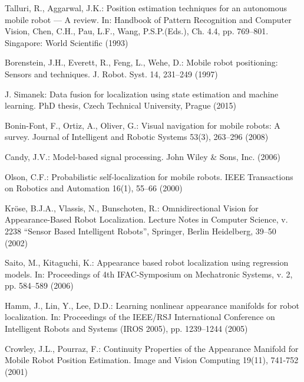 \documentclass[conference]{IEEEtran} %
\begin{document}
\begin{thebibliography}{100}

Talluri, R., Aggarwal, J.K.: Position estimation techniques for an autonomous mobile robot --- A review. In: Handbook of Pattern Recognition and Computer Vision, Chen, C.H., Pau, L.F., Wang, P.S.P.(Eds.), Ch. 4.4, pp. 769--801. Singapore: World Scientific (1993)

Borenstein, J.H., Everett, R., Feng, L., Wehe, D.: Mobile robot positioning: Sensors and techniques. J. Robot. Syst. 14, 231--249 (1997)

J. Simanek: Data fusion for localization using state estimation and machine learning. PhD thesis, Czech Technical University, Prague (2015)

Bonin-Font, F., Ortiz, A., Oliver, G.: Visual navigation for mobile robots: A survey. Journal of Intelligent and Robotic Systems 53(3), 263–296 (2008)

Candy, J.V.: Model-based signal processing. John Wiley \& Sons, Inc. (2006)

Olson, C.F.: Probabilistic self-localization for mobile robots. IEEE Transactions on Robotics and Automation 16(1), 55--66 (2000)

Kröse, B.J.A., Vlassis, N., Bunschoten, R.: Omnidirectional Vision for Appearance-Based Robot Localization. Lecture Notes in Computer Science, v. 2238 ``Sensor Based Intelligent Robots'', Springer, Berlin Heidelberg, 39--50 (2002)

Saito, M., Kitaguchi, K.: Appearance based robot localization using regression models. In: Proceedings of 4th IFAC-Symposium on Mechatronic Systems, v. 2, pp. 584--589 (2006)

Hamm, J., Lin, Y., Lee, D.D.: Learning nonlinear appearance manifolds for robot localization. In: Proceedings of the IEEE/RSJ International Conference on Intelligent Robots and Systems (IROS 2005), pp. 1239--1244 (2005)

Crowley, J.L., Pourraz, F.: Continuity Properties of the Appearance Manifold for Mobile Robot Position Estimation. Image and Vision Computing 19(11), 741-752 (2001)


\end{thebibliography}
\end{document}
